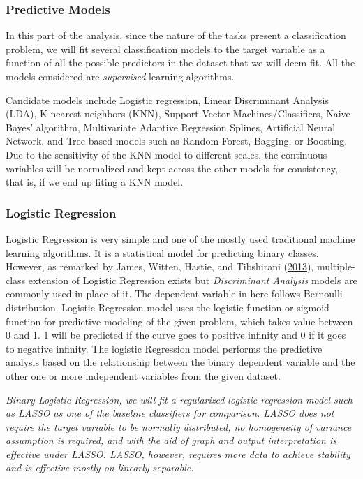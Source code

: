 \documentclass[
  10pt,
]{article}
\begin{document}
\subsubsection{Predictive Models}

In this part of the analysis, since the nature of the tasks present a classification problem, we will fit several classification models to the target variable as a function of all the possible predictors in the dataset that we will deem fit. All the models considered are \emph{supervised} learning algorithms.

Candidate models include Logistic regression, Linear Discriminant Analysis (LDA), K-nearest neighbors (KNN), Support Vector Machines/Classifiers, Naive Bayes' algorithm, Multivariate Adaptive Regression Splines, Artificial Neural Network, and Tree-based models such as Random Forest, Bagging, or Boosting. Due to the sensitivity of the KNN model to different scales, the continuous variables will be normalized and kept across the other models for consistency, that is, if we end up fiting a KNN model.

\hypertarget{logistic-regression}{%
\subsubsection{Logistic Regression}\label{logistic-regression}}

Logistic Regression is very simple and one of the mostly used traditional machine learning algorithms. It is a statistical model for predicting binary classes. However, as remarked by James, Witten, Hastie, and Tibshirani (\protect\hyperlink{ref-james2013introduction}{2013}), multiple-class extension of Logistic Regression exists but \emph{Discriminant Analysis} models are commonly used in place of it. The dependent variable in here follows Bernoulli distribution. Logistic Regression model uses the logistic function or sigmoid function for predictive modeling of the given problem, which takes value between 0 and 1. 1 will be predicted if the curve goes to positive infinity and 0 if it goes to negative infinity. The logistic Regression model performs the predictive analysis based on the relationship between the binary dependent variable and the other one or more independent variables from the given dataset.

\emph{Binary Logistic Regression, we will fit a regularized logistic regression model such as LASSO as one of the baseline classifiers for comparison. LASSO does not require the target variable to be normally distributed, no homogeneity of variance assumption is required, and with the aid of graph and output interpretation is effective under LASSO. LASSO, however, requires more data to achieve stability and is effective mostly on linearly separable.}
\end{document}
